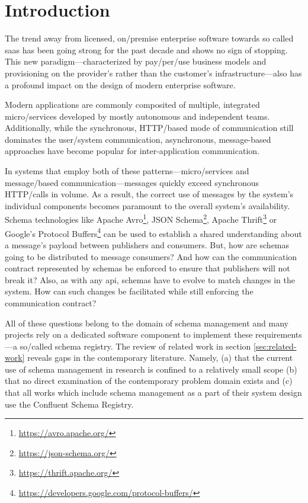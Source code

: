 
\section{Introduction}\label{sec:introduction}



The trend away from licensed, on\-/premise enterprise software towards so called \gls{saas} has been going strong for the past decade and shows no sign of stopping.
This new paradigm---characterized by pay\-/per\-/use business models and provisioning on the provider's rather than the customer's infrastructure---also has a profound impact on the design of modern enterprise software.

Modern applications are commonly composited of multiple, integrated micro\-/services developed by mostly autonomous and independent teams.
Additionally, while the synchronous, HTTP\-/based mode of communication still dominates the user\-/system communication, asynchronous, message-based approaches have become popular for  inter-application communication.

In systems that employ both of these patterns---micro\-/services and message\-/based communication---messages quickly exceed synchronous HTTP\-/calls in volume.
As a result, the correct use of messages by the system's individual components becomes paramount to the overall system's availability.
Schema technologies like Apache Avro\footnote{\url{https://avro.apache.org/}}, JSON Schema\footnote{\url{https://json-schema.org/}}, Apache Thrift\footnote{\url{https://thrift.apache.org/}} or Google's Protocol Buffers\footnote{\url{https://developers.google.com/protocol-buffers/}} can be used to establish a shared understanding about a message's payload between publishers and consumers.
But, how are schemas going to be distributed to message consumers?
And how can the communication contract represented by schemas be enforced to ensure that publishers will not break it?
Also, as with any \gls{api}, schemas have to evolve to match changes in the system.
How can such changes be facilitated while still enforcing the communication contract?

All of these questions belong to the domain of schema management and many projects rely on a dedicated software component to implement these requirements---a so\-/called schema registry.
The review of related work in section \ref{sec:related-work} reveals gaps in the contemporary literature.
Namely, (a) that the current use of schema management in research is confined to a relatively small scope (b) that no direct examination of the contemporary problem domain exists and (c) that all works which include schema management as a part of their system design use the Confluent Schema Registry.

